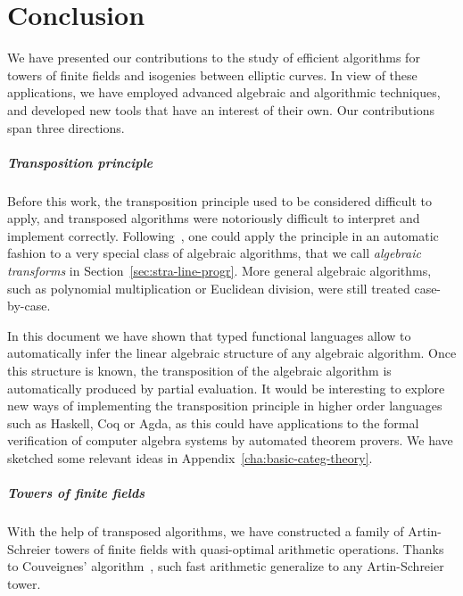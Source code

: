 

\chapter{Conclusion}

We have presented our contributions to the study of efficient
algorithms for towers of finite fields and isogenies between elliptic
curves. In view of these applications, we have employed advanced
algebraic and algorithmic techniques, and developed new tools that
have an interest of their own. Our contributions span three directions.

\paragraph{Transposition principle}
  Before this work,
the transposition principle used to be considered difficult to apply,
and transposed algorithms were notoriously difficult to interpret and
implement correctly.  Following~\cite{bostan+lecerf+schost:tellegen},
one could apply the principle in an automatic fashion to a very
special class of algebraic algorithms, that we call \emph{algebraic
  transforms} in Section~\ref{sec:stra-line-progr}. More general
algebraic algorithms, such as polynomial multiplication or Euclidean
division, were still treated case-by-case.

In this document we have shown that typed functional languages allow
to automatically infer the linear algebraic structure of any algebraic
algorithm. Once this structure is known, the transposition of the
algebraic algorithm is automatically produced by partial evaluation.
It would be interesting to explore new ways of implementing the
transposition principle in higher order languages such as Haskell, Coq
or Agda, as this could have applications to the formal verification of
computer algebra systems by automated theorem provers.  We have
sketched some relevant ideas in Appendix~\ref{cha:basic-categ-theory}.

\paragraph{Towers of finite fields}
With the help of transposed algorithms, we have constructed a family
of Artin-Schreier towers of finite fields with quasi-optimal
arithmetic operations. Thanks to Couveignes'
algorithm~\cite{couveignes00}, such fast arithmetic generalize to any
Artin-Schreier tower.


